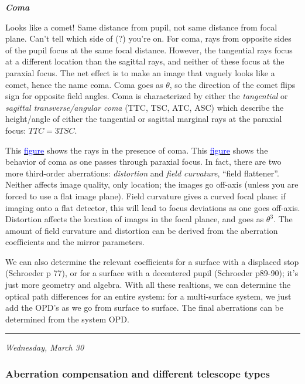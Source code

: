 \documentclass[12pt]{article}
\newcommand{\mynotes}[1]{\textcolor{myBlue}{#1}}
\begin{document}
\textbf{\emph{Coma}}

\textcolor{myBlue}{%
    Looks like a comet! Same distance from pupil, not same distance
    from focal plane. Can't tell which side of (?) you're on.
}
For coma, rays from opposite sides of the pupil focus at the same
focal distance. However, the tangential rays focus at a different
location than the sagittal rays, and neither of these focus at the
paraxial focus. The net effect is to make an image that vaguely looks
like a comet, hence the name coma. Coma goes as $\theta$, so the
direction of the comet flips sign for opposite field angles. Coma is
characterized by either the \emph{tangential} or \emph{sagittal
transverse/angular coma} (TTC, TSC, ATC, ASC) which describe the
height/angle of either the tangential or sagittal marginal rays at the
paraxial focus: $TTC = 3TSC$.

This \href{http://astronomy.nmsu.edu/holtz/a535/html/diagrams/a535/coma.htm}
{\textcolor{blue}{figure}} shows the rays in the presence of coma.
This \href{http://astronomy.nmsu.edu/holtz/a535/html/diagrams/a535/z7.htm}
{\textcolor{blue}{figure}} shows the behavior of coma as one passes
through paraxial focus.
In fact, there are two more third-order aberrations:
\textit{distortion} and \textit{field curvature},
\mynotes{``field flattener''}.
Neither affects image quality, only location;
\mynotes{the images go off-axis} (unless
you are forced to use a flat image plane). Field curvature gives a
curved focal plane: if imaging onto a flat detector, this will lead to
focus deviations as one goes off-axis. Distortion affects the location
of images in the focal plance, and goes as $\theta^{3}$.
The amount of field curvature and distortion can be derived from the
aberration coefficients and the mirror parameters.

We can also determine the relevant coefficients for a surface with a
displaced stop (Schroeder p 77), or for a surface with a decentered
pupil (Schroeder p89-90); it's just more geometry and algebra. With
all these realtions, we can determine the optical path differences for
an entire system: for a multi-surface system, we just add the OPD's as
we go from surface to surface. The final aberrations can be determined
from the system OPD.

\rule{\textwidth}{0.4pt}

{\small\hfill\emph{Wednesday, March 30}}

\subsubsection{Aberration compensation and different telescope types}
\end{document}
